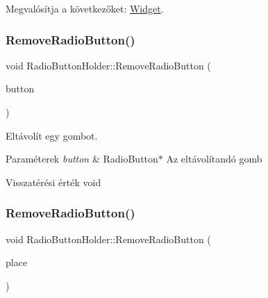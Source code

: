 Megvalósítja a következőket\+: \hyperlink{class_widget_a7a18323ef481add82e5edba5c0c6ec06}{Widget}.

\mbox{\label{class_radio_button_holder_a217e5620f70f0d2633e70896ad166f70}} 
\subsubsection{\texorpdfstring{Remove\+Radio\+Button()}{RemoveRadioButton()}\hspace{0.1cm}{\footnotesize\ttfamily [1/2]}}
{\footnotesize\ttfamily void Radio\+Button\+Holder\+::\+Remove\+Radio\+Button (\begin{DoxyParamCaption}\item[{\hyperlink{class_radio_button}{Radio\+Button} $\ast$}]{button }\end{DoxyParamCaption})}



Eltávolít egy gombot. 


\begin{DoxyParams}{Paraméterek}
{\em button} & Radio\+Button$\ast$ Az eltávolítandó gomb \\
\hline
\end{DoxyParams}
\begin{DoxyReturn}{Visszatérési érték}
void 
\end{DoxyReturn}
\mbox{\label{class_radio_button_holder_a8a44f58d480a8c1b4822adb9e9df0c98}} 
\subsubsection{\texorpdfstring{Remove\+Radio\+Button()}{RemoveRadioButton()}\hspace{0.1cm}{\footnotesize\ttfamily [2/2]}}
{\footnotesize\ttfamily void Radio\+Button\+Holder\+::\+Remove\+Radio\+Button (\begin{DoxyParamCaption}\item[{int}]{place }\end{DoxyParamCaption})}




